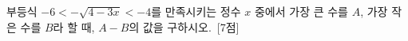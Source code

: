 부등식 $-6<-\sqrt{4-3x}<-4$를 만족시키는 정수 $x$ 중에서 가장 큰 수를 $A$, 가장 작은 수를 $B$라 할 때, $A-B$의 값을 구하시오.~\mbox{\mbox{[7점]}}
